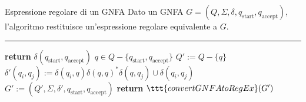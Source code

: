 \documentclass[a4paper, 12pt]{report}
\begin{document}
    \begin{framedalgo}[label={gnfa into regex}]{Espressione regolare di un GNFA}
        Dato un GNFA $G = (Q, \Sigma, \delta, q_{\mathrm{start}}, q_{\mathrm{accept}})$, l'algoritmo restituisce un'espressione regolare equivalente a $G$.

        \hrule
        \begin{algorithmic}[1]
                \State \textbf{return} $\delta(q_{\mathrm{start}}, q_{\mathrm{accept}})$
                    \State $q \in Q - \{q_{\mathrm{start}}, q_{\mathrm{accept}}\}$
                    \State $Q' := Q - \{q\}$
                            \State $\delta'(q_i, q_j) := \delta(q_i, q)\delta(q, q)^* \delta(q, q_j) \cup \delta(q_i, q_j)$
                        \EndFor
                    \EndFor
                    \State $G' := (Q', \Sigma, \delta', q_{\mathrm{start}}, q_{\mathrm{accept}})$
                    \State \textbf{return} $\ttt{convertGNFAtoRegEx}(G')$
                \EndIf
            \EndFunction
        \end{algorithmic}
    \end{framedalgo}
\end{document}
